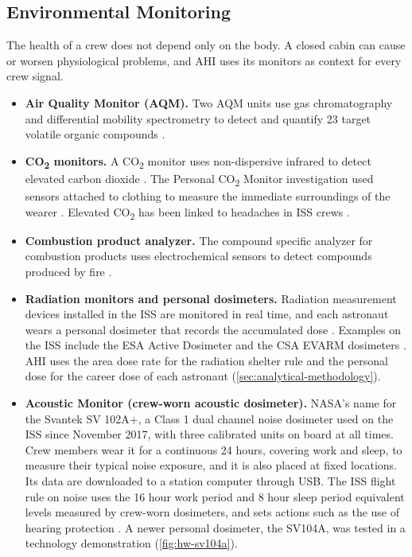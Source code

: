 \subsection{Environmental Monitoring}
\label{subsec:environmental-monitoring}

The health of a crew does not depend only on the body. A closed cabin can cause or worsen physiological problems, and AHI uses its monitors as context for every crew signal.

\begin{itemize}
\item \textbf{Air Quality Monitor (AQM).} Two AQM units use gas chromatography and differential mobility spectrometry to detect and quantify 23 target volatile organic compounds \cite{nasa_toxicology_envchem}.
\item \textbf{CO\textsubscript{2} monitors.} A CO\textsubscript{2} monitor uses non-dispersive infrared to detect elevated carbon dioxide \cite{nasa_toxicology_envchem}. The Personal CO\textsubscript{2} Monitor investigation used sensors attached to clothing to measure the immediate surroundings of the wearer \cite{nasa_wearable_tech_iss}. Elevated CO\textsubscript{2} has been linked to headaches in ISS crews \cite{nasa_ochmo_tb004_co2}.
\item \textbf{Combustion product analyzer.} The compound specific analyzer for combustion products uses electrochemical sensors to detect compounds produced by fire \cite{nasa_toxicology_envchem}.
\item \textbf{Radiation monitors and personal dosimeters.} Radiation measurement devices installed in the ISS are monitored in real time, and each astronaut wears a personal dosimeter that records the accumulated dose \cite{jaxa_medops_system}. Examples on the ISS include the ESA Active Dosimeter and the CSA EVARM dosimeters \cite{nasa_wearable_tech_iss}. AHI uses the area dose rate for the radiation shelter rule and the personal dose for the career dose of each astronaut (\ref{sec:analytical-methodology}).
\item \textbf{Acoustic Monitor (crew-worn acoustic dosimeter).} NASA's name for the Svantek SV 102A+, a Class 1 dual channel noise dosimeter used on the ISS since November 2017, with three calibrated units on board at all times. Crew members wear it for a continuous 24 hours, covering work and sleep, to measure their typical noise exposure, and it is also placed at fixed locations. Its data are downloaded to a station computer through USB. The ISS flight rule on noise uses the 16 hour work period and 8 hour sleep period equivalent levels measured by crew-worn dosimeters, and sets actions such as the use of hearing protection \cite{limardo2021noise}. A newer personal dosimeter, the SV104A, was tested in a technology demonstration (\ref{fig:hw-sv104a}).

\end{itemize}
